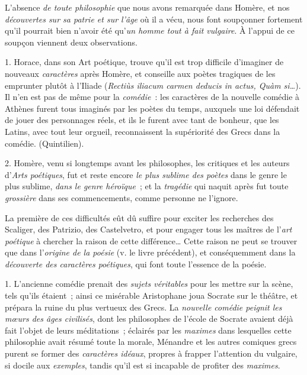 \documentclass[french,twoside]{book} %
\newcommand\chaptercont{} %
\begin{document}
\chaptercont
\noindent  L’absence {\itshape de toute philosophie} que nous avons remarquée dans Homère, et nos {\itshape découvertes sur sa patrie et sur l’âge} où il a vécu, nous font soupçonner fortement qu’il pourrait bien n’avoir été qu’{\itshape un homme tout à fait vulgaire}. À l’appui de ce soupçon viennent deux observations.\par
1. Horace, dans son Art poétique, trouve qu’il est trop difficile d’imaginer de nouveaux {\itshape caractères} après Homère, et conseille aux poètes tragiques de les emprunter plutôt à l’Iliade (\emph{{\itshape Rectiùs iliacum carmen deducis in actus, Quàm si…}}). Il n’en est pas de même pour la {\itshape comédie} : les caractères de la nouvelle comédie à Athènes furent tous imaginés par les poètes du temps, auxquels une loi défendait de jouer des personnages réels, et ils le furent avec tant de bonheur, que les Latins, avec tout leur orgueil, reconnaissent la supériorité des Grecs dans la comédie. (Quintilien).\par
 2. Homère, venu si longtemps avant les philosophes, les critiques et les auteurs d’{\itshape Arts poétiques}, fut et reste encore {\itshape le plus sublime des poètes} dans le genre le plus sublime, {\itshape dans le genre héroïque} ; et la {\itshape tragédie} qui naquit après fut toute {\itshape grossière} dans ses commencements, comme personne ne l’ignore.\par
La première de ces difficultés eût dû suffire pour exciter les recherches des Scaliger, des Patrizio, des Castelvetro, et pour engager tous les maîtres de l’{\itshape art poétique} à chercher la raison de cette différence… Cette raison ne peut se trouver que dans l’{\itshape origine de la poésie} (v. le livre précédent), et conséquemment dans la {\itshape découverte des caractères poétiques}, qui font toute l’essence de la poésie.\par
1. L’ancienne comédie prenait des {\itshape sujets véritables} pour les mettre sur la scène, tels qu’ils étaient ; ainsi ce misérable Aristophane joua Socrate sur le théâtre, et prépara la ruine du plus vertueux des Grecs. La {\itshape nouvelle comédie peignit les mœurs des âges civilisés}, dont les philosophes de l’école de Socrate avaient déjà fait l’objet de leurs méditations ; éclairés par les {\itshape maximes} dans lesquelles cette philosophie avait résumé toute la morale, Ménandre et les autres comiques grecs purent se former des {\itshape caractères idéaux}, propres à frapper l’attention du vulgaire, si docile aux {\itshape exemples}, tandis qu’il est si incapable de profiter des {\itshape maximes}.\par
\end{document}
